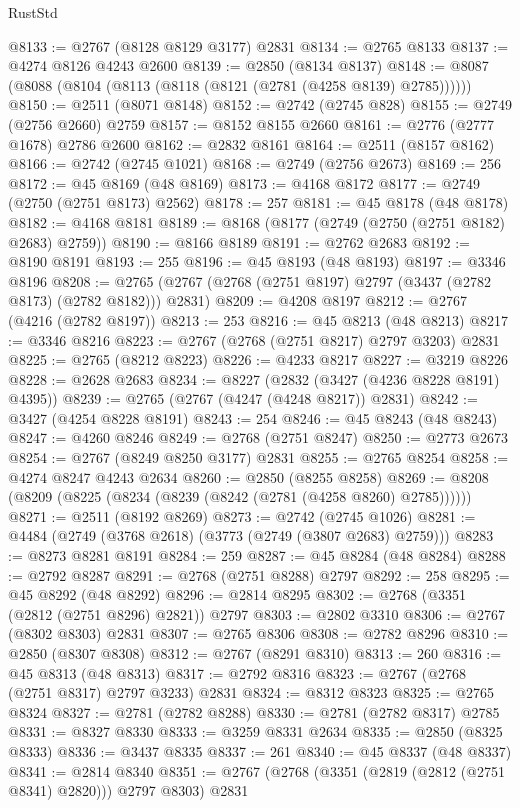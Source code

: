 \begin{lexlean}{RustStd}
\begin{coremodule}
@8133 := @2767 (@8128 @8129 @3177) @2831
@8134 := @2765 @8133
@8137 := @4274 @8126 @4243 @2600
@8139 := @2850 (@8134 @8137)
@8148 := @8087 (@8088 (@8104 (@8113 (@8118 (@8121 (@2781 (@4258 @8139) @2785))))))
@8150 := @2511 (@8071 @8148)
@8152 := @2742 (@2745 @828)
@8155 := @2749 (@2756 @2660) @2759
@8157 := @8152 @8155 @2660
@8161 := @2776 (@2777 @1678) @2786 @2600
@8162 := @2832 @8161
@8164 := @2511 (@8157 @8162)
@8166 := @2742 (@2745 @1021)
@8168 := @2749 (@2756 @2673)
@8169 := 256
@8172 := @45 @8169 (@48 @8169)
@8173 := @4168 @8172
@8177 := @2749 (@2750 (@2751 @8173) @2562)
@8178 := 257
@8181 := @45 @8178 (@48 @8178)
@8182 := @4168 @8181
@8189 := @8168 (@8177 (@2749 (@2750 (@2751 @8182) @2683) @2759))
@8190 := @8166 @8189
@8191 := @2762 @2683
@8192 := @8190 @8191
@8193 := 255
@8196 := @45 @8193 (@48 @8193)
@8197 := @3346 @8196
@8208 := @2765 (@2767 (@2768 (@2751 @8197) @2797 (@3437 (@2782 @8173) (@2782 @8182))) @2831)
@8209 := @4208 @8197
@8212 := @2767 (@4216 (@2782 @8197))
@8213 := 253
@8216 := @45 @8213 (@48 @8213)
@8217 := @3346 @8216
@8223 := @2767 (@2768 (@2751 @8217) @2797 @3203) @2831
@8225 := @2765 (@8212 @8223)
@8226 := @4233 @8217
@8227 := @3219 @8226
@8228 := @2628 @2683
@8234 := @8227 (@2832 (@3427 (@4236 @8228 @8191) @4395))
@8239 := @2765 (@2767 (@4247 (@4248 @8217)) @2831)
@8242 := @3427 (@4254 @8228 @8191)
@8243 := 254
@8246 := @45 @8243 (@48 @8243)
@8247 := @4260 @8246
@8249 := @2768 (@2751 @8247)
@8250 := @2773 @2673
@8254 := @2767 (@8249 @8250 @3177) @2831
@8255 := @2765 @8254
@8258 := @4274 @8247 @4243 @2634
@8260 := @2850 (@8255 @8258)
@8269 := @8208 (@8209 (@8225 (@8234 (@8239 (@8242 (@2781 (@4258 @8260) @2785))))))
@8271 := @2511 (@8192 @8269)
@8273 := @2742 (@2745 @1026)
@8281 := @4484 (@2749 (@3768 @2618) (@3773 (@2749 (@3807 @2683) @2759)))
@8283 := @8273 @8281 @8191
@8284 := 259
@8287 := @45 @8284 (@48 @8284)
@8288 := @2792 @8287
@8291 := @2768 (@2751 @8288) @2797
@8292 := 258
@8295 := @45 @8292 (@48 @8292)
@8296 := @2814 @8295
@8302 := @2768 (@3351 (@2812 (@2751 @8296) @2821)) @2797
@8303 := @2802 @3310
@8306 := @2767 (@8302 @8303) @2831
@8307 := @2765 @8306
@8308 := @2782 @8296
@8310 := @2850 (@8307 @8308)
@8312 := @2767 (@8291 @8310)
@8313 := 260
@8316 := @45 @8313 (@48 @8313)
@8317 := @2792 @8316
@8323 := @2767 (@2768 (@2751 @8317) @2797 @3233) @2831
@8324 := @8312 @8323
@8325 := @2765 @8324
@8327 := @2781 (@2782 @8288)
@8330 := @2781 (@2782 @8317) @2785
@8331 := @8327 @8330
@8333 := @3259 @8331 @2634
@8335 := @2850 (@8325 @8333)
@8336 := @3437 @8335
@8337 := 261
@8340 := @45 @8337 (@48 @8337)
@8341 := @2814 @8340
@8351 := @2767 (@2768 (@3351 (@2819 (@2812 (@2751 @8341) @2820))) @2797 @8303) @2831

\end{coremodule}
\end{lexlean}
